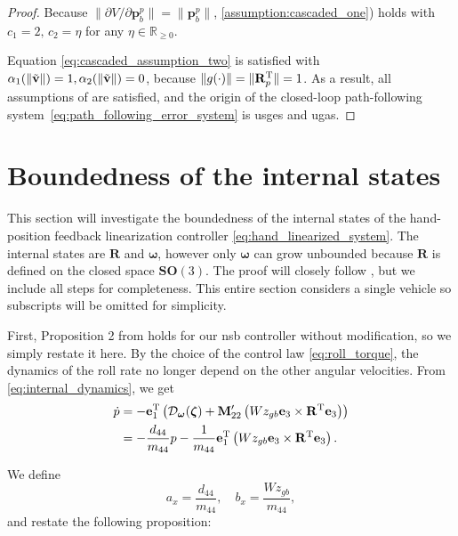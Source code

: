 \begin{proof}
Because $\|\partial V/\partial \mathbf{p}_b^p\| = \|\mathbf{p}_b^p\|$, \ref{assumption:cascaded_one}) holds with $c_1 = 2, \, c_2 = \eta$ for any $\eta \in \mathbb{R}_{\geq 0}$.

Equation \eqref{eq:cascaded_assumption_two} is satisfied with $\alpha_1(\|\Tilde{\mathbf{v}}\|) = 1, \alpha_2(\|\Tilde{\mathbf{v}}\|) = 0$, because $\|g(\cdot)\| = \|\mathbf{R}_p^{\rm T}\| = 1$. As a result, all assumptions of \cite[Proposition 9]{pettersen_lyapunov_2017} are satisfied, and the origin of the closed-loop path-following system~\eqref{eq:path_following_error_system} is \gls{usges} and \gls{ugas}.
\end{proof}


\section{Boundedness of the internal states}\label{sec:boundedness_internal}
This section will investigate the boundedness of the internal states of the hand-position feedback linearization controller \eqref{eq:hand_linearized_system}. The internal states are $\mathbf{R}$ and $\bm{\omega}$, however only $\bm{\omega}$ can grow unbounded because $\mathbf{R}$ is defined on the closed space $\mathbf{SO}(3)$. The proof will closely follow \cite[Proposition 2 and 3]{matous_trajectory_2023}, but we include all steps for completeness. This entire section considers a single vehicle so subscripts will be omitted for simplicity.

First, Proposition 2 from \cite{matous_trajectory_2023} holds for our \gls{nsb} controller without modification, so we simply restate it here. By the choice of the control law \eqref{eq:roll_torque}, the dynamics of the roll rate no longer depend on the other angular velocities. From \eqref{eq:internal_dynamics}, we get
    \begin{equation}
        \begin{split}
            \dot{p} &= - \mathbf{e}_1^{\rm T} \left(\mathcal{D}_{\bm{\omega}}(\bm{\zeta}) + \mathbf{M}_{22}^{\prime}\left(Wz_{gb} \mathbf{e}_3 \times \mathbf{R}^{\rm T} \mathbf{e}_3\right)\right) \\
                &= - \frac{d_{44}}{m_{44}} p - \frac{1}{m_{44}} \mathbf{e}_1^{\rm T} \left(Wz_{gb} \mathbf{e}_3 \times \mathbf{R}^{\rm T} \mathbf{e}_3\right).
        \end{split}
    \end{equation} 
    
    We define
\begin{equation}
    a_x = \frac{d_{44}}{m_{44}}, \quad b_x = \frac{W z_{gb}}{m_{44}},
\end{equation}
and restate the following proposition:

